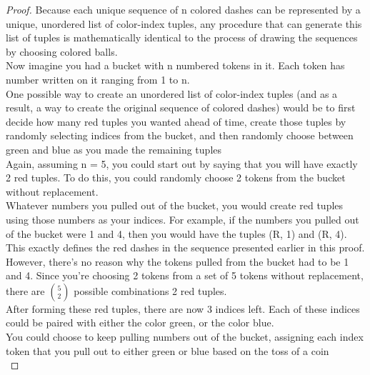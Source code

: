 \documentclass[11pt,fleqn]{article}
\theoremstyle{definition}
\theoremstyle{remark}
\begin{document}
\begin{enumerate}
\begin{proof}
        Because each unique sequence of n colored dashes can be represented
        by a unique, unordered list of color-index tuples, any procedure that can
        generate this list of tuples is mathematically identical to 
        the process of drawing the sequences by choosing colored balls.\\

        Now imagine you had a bucket with n numbered tokens in it. Each
        token has number written on it ranging from 1 to n.\\ 
        
        One possible way to create an unordered list of color-index 
        tuples (and as a result, a way to create the original sequence
        of colored dashes) would be to first decide how many red tuples
        you wanted ahead of time, create those tuples by randomly selecting
        indices from the bucket, and then randomly choose between
        green and blue as you made the remaining tuples\\

        Again, assuming n = 5, you could start out by saying that you
        will have exactly 2 red tuples. To do this, you could randomly
        choose 2 tokens from the bucket without replacement.\\

        Whatever numbers you pulled out of the bucket, you would create
        red tuples using those numbers as your indices. For example,
        if the numbers you pulled out of the bucket were 1 and 4,
        then you would have the tuples (R, 1) and (R, 4). 
        This exactly defines the red dashes in the sequence presented
        earlier in this proof.\\

        However, there's no reason why the tokens pulled from the bucket
        had to be 1 and 4. Since you're choosing 2 tokens from a 
        set of 5 tokens without replacement, there are $\binom{5}{2}$
        possible combinations 2 red tuples.\\

        After forming these red tuples, there are now 3 indices left.
        Each of these indices could be paired with either 
        the color green, or the color blue.\\

        You could choose to keep pulling numbers out of the bucket,
        assigning each index token that you pull out 
        to either green or blue based on the toss of a coin\\ 
        

\end{proof}
\end{enumerate}
\end{document}
